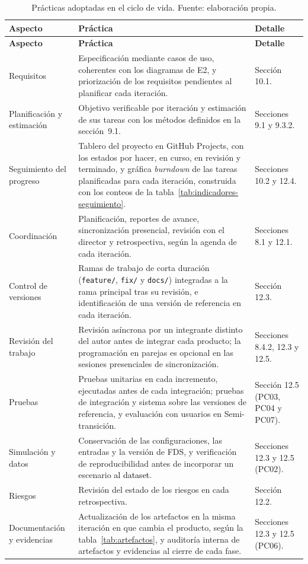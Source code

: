 \begin{longtable}{|p{}|p{}|p{}|}
\caption{Prácticas adoptadas en el ciclo de vida. Fuente: elaboración propia.}\label{tab:practicas}\\
\hline
\textbf{Aspecto} & \textbf{Práctica} & \textbf{Detalle}\\\hline
\endfirsthead
\hline
\textbf{Aspecto} & \textbf{Práctica} & \textbf{Detalle}\\\hline
\endhead
Requisitos & Especificación mediante casos de uso, coherentes con los diagramas de E2, y priorización de los requisitos pendientes al planificar cada iteración. & Sección 10.1.\\\hline
Planificación y estimación & Objetivo verificable por iteración y estimación de sus tareas con los métodos definidos en la sección~9.1. & Secciones 9.1 y 9.3.2.\\\hline
Seguimiento del progreso & Tablero del proyecto en GitHub Projects, con los estados por hacer, en curso, en revisión y terminado, y gráfica \textit{burndown} de las tareas planificadas para cada iteración, construida con los conteos de la tabla~\ref{tab:indicadores-seguimiento}. & Secciones 10.2 y 12.4.\\\hline
Coordinación & Planificación, reportes de avance, sincronización presencial, revisión con el director y retrospectiva, según la agenda de cada iteración. & Secciones 8.1 y 12.1.\\\hline
Control de versiones & Ramas de trabajo de corta duración (\texttt{feature/}, \texttt{fix/} y \texttt{docs/}) integradas a la rama principal tras su revisión, e identificación de una versión de referencia en cada iteración. & Sección 12.3.\\\hline
Revisión del trabajo & Revisión asíncrona por un integrante distinto del autor antes de integrar cada producto; la programación en parejas es opcional en las sesiones presenciales de sincronización. & Secciones 8.4.2, 12.3 y 12.5.\\\hline
Pruebas & Pruebas unitarias en cada incremento, ejecutadas antes de cada integración; pruebas de integración y sistema sobre las versiones de referencia, y evaluación con usuarios en Semi-transición. & Sección 12.5 (PC03, PC04 y PC07).\\\hline
Simulación y datos & Conservación de las configuraciones, las entradas y la versión de FDS, y verificación de reproducibilidad antes de incorporar un escenario \textcolor{black}{al dataset}. & Secciones 12.3 y 12.5 (PC02).\\\hline
Riesgos & Revisión del estado de los riesgos en cada retrospectiva. & Sección 12.2.\\\hline
Documentación y evidencias & Actualización de los artefactos en la misma iteración en que cambia el producto, según la tabla~\ref{tab:artefactos}, y auditoría interna de artefactos y evidencias al cierre de cada fase. & Secciones 12.3 y 12.5 (PC06).\\\hline
\end{longtable}

